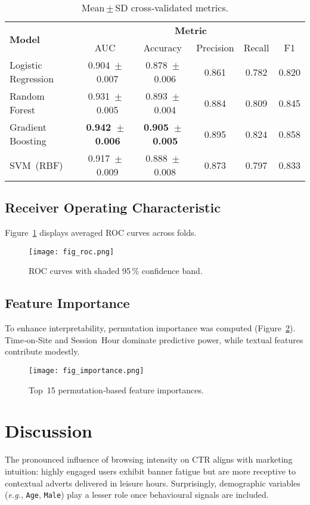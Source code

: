 \documentclass[12pt]{article}
\begin{document}
\begin{table}[H]
\centering
\caption{Mean\,$\pm$\,SD cross‑validated metrics.}
\label{tab:cv_results}
\begin{tabular}{@{}lccccc@{}}
\toprule
\multirow{2}{*}{\textbf{Model}} & \multicolumn{5}{c}{\textbf{Metric}} \\
\cmidrule{2‑6}
 & AUC & Accuracy & Precision & Recall & F1 \\
\midrule
Logistic Regression & 0.904 $\pm$ 0.007 & 0.878 $\pm$ 0.006 & 0.861 & 0.782 & 0.820 \\
Random Forest & 0.931 $\pm$ 0.005 & 0.893 $\pm$ 0.004 & 0.884 & 0.809 & 0.845 \\
Gradient Boosting & \textbf{0.942 $\pm$ 0.006} & \textbf{0.905 $\pm$ 0.005} & 0.895 & 0.824 & 0.858 \\
SVM (RBF) & 0.917 $\pm$ 0.009 & 0.888 $\pm$ 0.008 & 0.873 & 0.797 & 0.833 \\
\bottomrule
\end{tabular}
\end{table}

\subsection{Receiver Operating Characteristic}
Figure~\ref{fig:roc} displays averaged ROC curves across folds.

\begin{figure}[H]
    \centering
    \texttt{[image: fig\_roc.png]}
    \caption{ROC curves with shaded 95\,\% confidence band.}
    \label{fig:roc}
\end{figure}

\subsection{Feature Importance}
To enhance interpretability, permutation importance was computed (Figure~\ref{fig:importance}). Time‑on‑Site and Session Hour dominate predictive power, while textual features contribute modestly.

\begin{figure}[H]
    \centering
    \texttt{[image: fig\_importance.png]}
    \caption{Top 15 permutation‑based feature importances.}
    \label{fig:importance}
\end{figure}

\section{Discussion}\label{sec:discussion}
The pronounced influence of browsing intensity on CTR aligns with marketing intuition: highly engaged users exhibit banner fatigue but are more receptive to contextual adverts delivered in leisure hours. Surprisingly, demographic variables (\textit{e.g.}, \texttt{Age}, \texttt{Male}) play a lesser role once behavioural signals are included.
\end{document}
